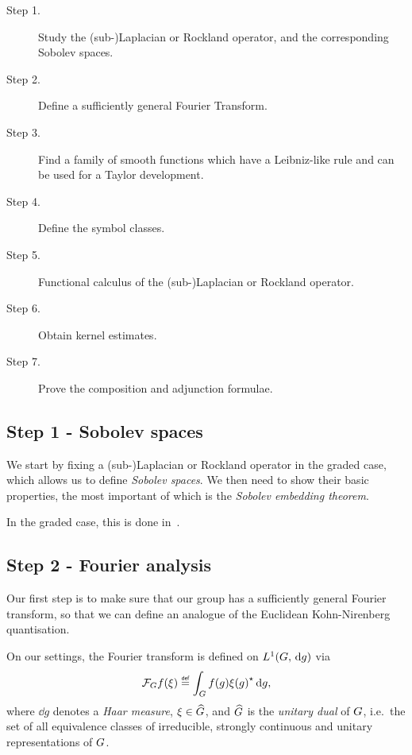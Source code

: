\begin{description}
    \item[Step 1.] Study the (sub-)Laplacian or Rockland operator,
        and the corresponding Sobolev spaces.
    \item[Step 2.] Define a sufficiently general Fourier Transform.
    \item[Step 3.] Find a family of smooth functions which have a Leibniz-like rule and can be used for a Taylor development.
    \item[Step 4.] Define the symbol classes.
    \item[Step 5.] Functional calculus of the (sub-)Laplacian or Rockland operator.
    \item[Step 6.] Obtain kernel estimates.
    \item[Step 7.] Prove the composition and adjunction formulae.
\end{description}

\subsection*{Step 1 - Sobolev spaces}

We start by fixing a (sub-)Laplacian or Rockland operator in the graded case,
which allows us to define \emph{Sobolev spaces}.
We then need to show their basic properties,
the most important of which is the \emph{Sobolev embedding theorem}.

In the graded case,
this is done in~\cite[Chapter 4]{FischerRuzhansky16}.

\subsection*{Step 2 - Fourier analysis}

Our first step is to make sure that our group has a sufficiently general Fourier transform,
so that we can define an analogue of the Euclidean Kohn-Nirenberg quantisation.

On our settings,
the Fourier transform is defined on ${L^{1} (G, \,\mathrm{d} g)}$ via
\begin{align*}
    \Fourier f(\xi)
    \defeq \int_\Group f(g) \adj{\xi(g)} \dd g,
\end{align*}
where $\dd g$ denotes a \emph{Haar measure},
$\xi \in {\widehat{G}}$,
and ${\widehat{G}}$ is the \emph{unitary dual} of $G$,
i.e.\ the set of all equivalence classes of irreducible, strongly continuous and unitary representations of $G$.

